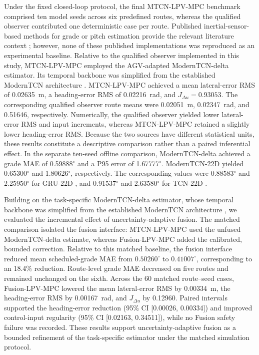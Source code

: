 \documentclass{ieeeaccess}
\newcommand{\citep}[1]{\cite{#1}}
\begin{document}
Under the fixed closed-loop protocol, the final MTCN-LPV-MPC benchmark
comprised ten model seeds across six predefined routes, whereas the
qualified observer contributed one deterministic case per route.
Published inertial-sensor-based methods for grade or pitch estimation provide
the relevant literature context
\citep{Jauch2018IMUGradeOrientation,Li2022QuaternionUKFGrade,
Kim2023InertialRoadPitch}; however, none of these published implementations
was reproduced as an experimental baseline. Relative to the qualified observer
implemented in this study, MTCN-LPV-MPC employed the AGV-adapted
ModernTCN-delta estimator. Its temporal backbone was simplified from the
established ModernTCN architecture \citep{Luo2024ModernTCN}. MTCN-LPV-MPC
achieved a mean lateral-error RMS of 0.02635~m, a heading-error RMS of
0.02216~rad, and $J_{\Delta u}=0.93053$. The corresponding qualified observer
route means were 0.02051~m, 0.02347~rad, and 0.51646, respectively. Numerically,
the qualified observer yielded lower lateral-error RMS and input increments,
whereas MTCN-LPV-MPC retained a slightly lower heading-error RMS. Because the
two sources have different statistical units, these results constitute a
descriptive comparison rather than a paired inferential effect. In the
separate ten-seed offline comparison, ModernTCN-delta achieved a grade MAE of
0.59888$^{\circ}$ and a P95 error of 1.67777$^{\circ}$. ModernTCN-22D yielded
0.65300$^{\circ}$ and 1.80626$^{\circ}$, respectively. The corresponding
values were 0.88583$^{\circ}$ and 2.25950$^{\circ}$ for GRU-22D
\citep{Cho2014GRU}, and 0.91537$^{\circ}$ and 2.63580$^{\circ}$ for TCN-22D
\citep{Bai2018TCN,Cao2021TCNRSA}.

Building on the task-specific ModernTCN-delta estimator, whose temporal
backbone was simplified from the established ModernTCN architecture
\citep{Luo2024ModernTCN}, we evaluated the incremental effect of
uncertainty-adaptive fusion. The matched comparison isolated the fusion
interface: MTCN-LPV-MPC used the unfused ModernTCN-delta estimate,
whereas Fusion-LPV-MPC added the calibrated, bounded correction.
Relative to this matched baseline, the fusion interface reduced mean
scheduled-grade MAE from $0.50260^{\circ}$ to $0.41007^{\circ}$,
corresponding to an 18.4\% reduction. Route-level grade MAE decreased
on five routes and remained unchanged on the sixth. Across the 60
matched route--seed cases, Fusion-LPV-MPC lowered the mean lateral-error
RMS by 0.00334~m, the heading-error RMS by 0.00167~rad, and
$J_{\Delta u}$ by 0.12960. Paired intervals supported the heading-error
reduction (95\% CI [0.00026, 0.00334]) and improved control-input
regularity (95\% CI [0.02163, 0.34511]), while no Fusion safety failure
was recorded. These results support uncertainty-adaptive fusion as a
bounded refinement of the task-specific estimator under the matched
simulation protocol.
\end{document}
